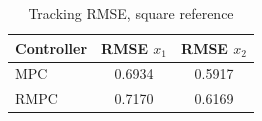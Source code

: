 \begin{table}[t]
\centering
\caption{Tracking RMSE, square reference}
\label{tab:rmse_square_mpc_rmpc}
\begin{tabular}{lcc}
\toprule
Controller & RMSE $x_1$ & RMSE $x_2$ \\
\midrule
MPC & 0.6934 & 0.5917 \\
RMPC & 0.7170 & 0.6169 \\
\bottomrule
\end{tabular}
\end{table}
